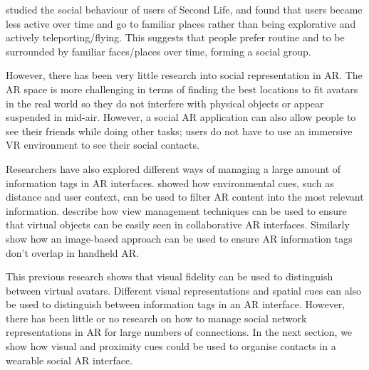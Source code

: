 \cite{Harris2009} studied the social behaviour of users of Second Life, and found that users became less active over time and go to familiar places rather than being explorative and actively teleporting/flying. This suggests that people prefer routine and to be surrounded by familiar faces/places over time, forming a social group.

However, there has been very little research into social representation in AR. The AR space is more challenging in terms of finding the best locations to fit avatars in the real world so they do not interfere with physical objects or appear suspended in mid-air. However, a social AR application can also allow people to see their friends while doing other tasks; users do not have to use an immersive VR environment to see their social contacts.

Researchers have also explored different ways of managing a large amount of information tags in AR interfaces. \cite{Julier2002} showed how environmental cues, such as distance and user context, can be used to filter AR content into the most relevant information. \cite{Hollerer2001} describe how view management techniques can be used to ensure that virtual objects can be easily seen in collaborative AR interfaces. Similarly \cite{Grasset2012} show how an image-based approach can be used to ensure AR information tags don't overlap in handheld AR. 

This previous research shows that visual fidelity can be used to distinguish between virtual avatars. Different visual representations and spatial cues can also be used to distinguish between information tags in an AR interface. However, there has been little or no research on how to manage social network representations in AR for large numbers of connections. In the next section, we show how visual and proximity cues could be used to organise contacts in a wearable social AR interface.



